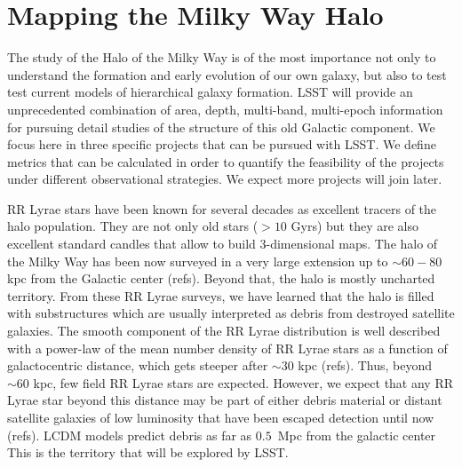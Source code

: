 %
%
%
%
%
%
%

\section{Mapping the Milky Way Halo}
\def\secname{MW_Halo}\label{sec:\secname} %


The study of the Halo of the Milky Way is of the most importance not only to understand
the formation and early evolution of our own galaxy, but also to test 
test current models of hierarchical galaxy formation. 
LSST will provide an unprecedented combination of
area, depth, multi-band, multi-epoch information for pursuing detail studies
of the structure of this old Galactic component. We focus here in three
specific projects that can be pursued with LSST. We define metrics that can
be calculated in order to quantify the feasibility of the projects under different
observational strategies. We expect more projects will join later.

RR Lyrae stars have been known for several decades as excellent tracers
of the halo population. They are not only old stars ($>10$ Gyrs) but they are
also excellent standard candles that allow to build 3-dimensional maps. 
The halo of the Milky Way has been now surveyed in a very large extension up to 
$\sim 60-80$ kpc from the Galactic center (refs). Beyond that, the halo is
mostly uncharted territory.
From these RR Lyrae surveys, we have learned that the halo is filled with substructures
which are usually interpreted as debris from destroyed satellite galaxies. The smooth 
component of the RR Lyrae distribution is well described
with a power-law of the mean number density of RR Lyrae stars as a function of
galactocentric distance, which gets steeper after $\sim 30$ kpc (refs). 
Thus, beyond $\sim 60$ kpc, few field RR Lyrae stars are expected. However, we expect that 
any RR Lyrae star beyond this distance may be part of either debris material or distant
satellite galaxies of low luminosity that have been escaped detection until now (refs). 
LCDM models predict debris as far as $0.5$~Mpc from the galactic center
This is the territory that will be explored by LSST.

